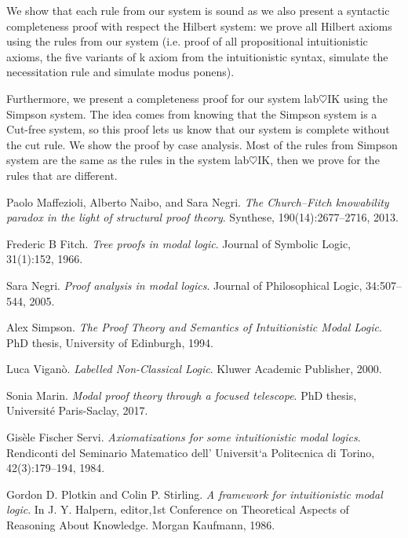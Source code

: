 \documentclass[twoside]{aiml18}
\begin{document}
We show that each rule from our system is sound as we also present a syntactic completeness proof with respect the Hilbert system: we prove all Hilbert axioms using the rules from our system (i.e. proof of all propositional intuitionistic axioms, the five variants of k axiom from the intuitionistic syntax, simulate the necessitation rule and simulate modus ponens).

Furthermore, we present a completeness proof for our system lab$\heartsuit$IK using the Simpson system. The idea comes from knowing that the Simpson system is a Cut-free system, so this proof lets us know that our system is complete without the cut rule. We show the proof by case analysis. Most of the rules from Simpson system are the same as the rules in the system lab$\heartsuit$IK, then we prove for the rules that are different.


\begin{thebibliography}{4}
Paolo Maffezioli, Alberto Naibo, and Sara Negri. \emph{The Church–Fitch knowability paradox in the light of structural proof theory}. Synthese, 190(14):2677–2716, 2013. 

Frederic B Fitch. \emph{Tree proofs in modal logic}. Journal of Symbolic Logic, 31(1):152, 1966.

Sara Negri. \emph{Proof analysis in modal logics}. Journal of Philosophical Logic, 34:507–544, 2005. 

Alex Simpson. \emph{The Proof Theory and Semantics of Intuitionistic Modal Logic}. PhD thesis, University of Edinburgh, 1994. 

Luca Viganò. \emph{Labelled Non-Classical Logic}. Kluwer Academic Publisher, 2000. 

Sonia Marin. \emph{Modal proof theory through a focused telescope}. PhD thesis, Université Paris-Saclay, 2017.

Gisèle Fischer Servi.\emph{ Axiomatizations for some intuitionistic modal logics}. Rendiconti del Seminario Matematico dell’ Universit`a Politecnica di Torino, 42(3):179–194, 1984.

Gordon D. Plotkin and Colin P. Stirling. \emph{A framework for intuitionistic modal logic}. In J. Y. Halpern, editor,1st Conference on Theoretical Aspects of Reasoning About Knowledge.
Morgan Kaufmann, 1986.

\end{thebibliography}
\end{document}
